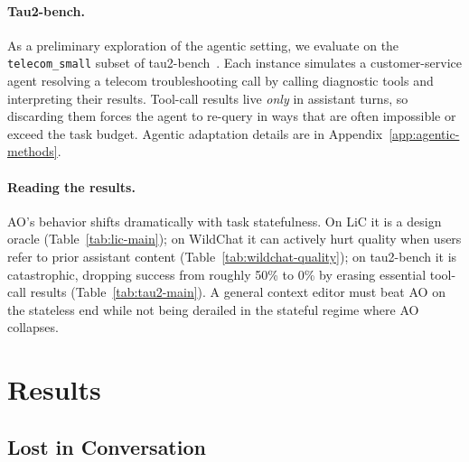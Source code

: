 \documentclass{article}
\begin{document}
\paragraph{Tau2-bench.}
As a preliminary exploration of the agentic setting, we evaluate on the \texttt{telecom\_small} subset of tau2-bench~\citep{yao2024tau}. Each instance simulates a customer-service agent resolving a telecom troubleshooting call by calling diagnostic tools and interpreting their results. Tool-call results live \emph{only} in assistant turns, so discarding them forces the agent to re-query in ways that are often impossible or exceed the task budget. Agentic adaptation details are in Appendix~\ref{app:agentic-methods}.

\paragraph{Reading the results.} AO's behavior shifts dramatically with task statefulness. On LiC it is a design oracle (Table~\ref{tab:lic-main}); on WildChat it can actively hurt quality when users refer to prior assistant content (Table~\ref{tab:wildchat-quality}); on tau2-bench it is catastrophic, dropping success from roughly 50\% to 0\% by erasing essential tool-call results (Table~\ref{tab:tau2-main}). A general context editor must beat AO on the stateless end while not being derailed in the stateful regime where AO collapses.

\section{Results}
\label{sec:results}

\subsection{Lost in Conversation}
\label{sec:lic-results}
\end{document}

